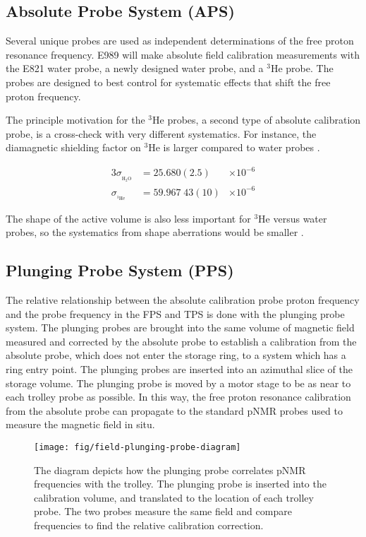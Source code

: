 \subsection{Absolute Probe System (APS)}

Several unique probes are used as independent determinations of the free proton resonance frequency.  E989 will make absolute field calibration measurements with the E821 water probe, a newly designed water probe, and a $\mathrm{^3He}$ probe. The probes are designed to best control for systematic effects that shift the free proton frequency.

The principle motivation for the $\mathrm{^3He}$ probes, a second type of absolute calibration probe, is a cross-check with very different systematics.  For instance, the diamagnetic shielding factor on $\mathrm{^3He}$ is larger compared to water probes \cite{e989-tdr}.

\begin{alignat}{3}
\sigma_{_{\mathrm{H_2 O}}} & = 25.680(2.5)  & \times 10^{-6} \\
\sigma_{_{\mathrm{^3He}}}  & = 59.967\;43(10) & \times 10^{-6} 
\end{alignat}

\noindent
The shape of the active volume is also less important for $\mathrm{^3He}$ versus water probes, so the systematics from shape aberrations would be smaller \cite{e989-tdr}.

\subsection{Plunging Probe System (PPS)}

The relative relationship between the absolute calibration probe proton frequency and the probe frequency in the FPS and TPS is done with the plunging probe system.  The plunging probes are brought into the same volume of magnetic field measured and corrected by the absolute probe to establish a calibration from the absolute probe, which does not enter the storage ring, to a system which has a ring entry point.  The plunging probes are inserted into an azimuthal slice of the storage volume.  The plunging probe is moved by a motor stage to be as near to each trolley probe as possible.  In this way, the free proton resonance calibration from the absolute probe can propagate to the standard pNMR probes used to measure the \gmtwo magnetic field in situ.

\begin{figure}
\label{fig:field-plunging-probe-diagram}
\texttt{[image: fig/field-plunging-probe-diagram]}
\caption{The diagram depicts how the plunging probe correlates pNMR frequencies with the trolley.  The plunging probe is inserted into the calibration volume, and translated to the location of each trolley probe.  The two probes measure the same field and compare frequencies to find the relative calibration correction.}
\end{figure}

